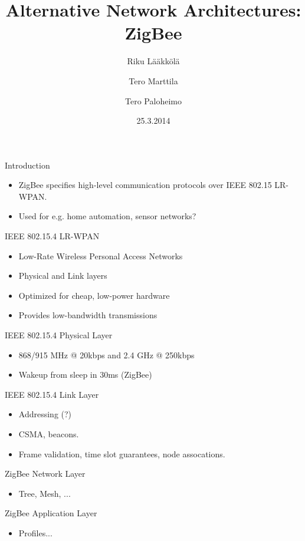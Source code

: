 \documentclass{beamer}
\title[ZigBee]{Alternative Network Architectures: ZigBee}
\author{Riku Lääkkölä \and Tero Marttila \and Tero Paloheimo}
\institute{Aalto ELEC}
\date{25.3.2014}
\begin{document}
\begin{frame}
  	\titlepage
\end{frame}


\begin{frame}{Introduction}
  \begin{itemize}
    \item ZigBee specifies high-level communication protocols over IEEE 802.15 LR-WPAN.
    \item Used for e.g. home automation, sensor networks?
  \end{itemize}
\end{frame}

\begin{frame}{IEEE 802.15.4 LR-WPAN}
  \begin{itemize}
  	\item Low-Rate Wireless Personal Access Networks
	\item Physical and Link layers
  	\item Optimized for cheap, low-power hardware
  	\item Provides low-bandwidth transmissions
  	
  \end{itemize}
\end{frame}

\begin{frame}{IEEE 802.15.4 Physical Layer}
  \begin{itemize}
  	\item 868/915 MHz @ 20kbps and 2.4 GHz @ 250kbps
    \item Wakeup from sleep in 30ms (ZigBee)
  \end{itemize}
\end{frame}
    
\begin{frame}{IEEE 802.15.4 Link Layer}
  \begin{itemize}
  	\item Addressing (?)
  	\item CSMA, beacons.
  	\item Frame validation, time slot guarantees, node assocations.
  \end{itemize}
\end{frame}

\begin{frame}{ZigBee Network Layer}
  \begin{itemize}
  	\item Tree, Mesh, ...
  \end{itemize}
\end{frame}

\begin{frame}{ZigBee Application Layer}
  \begin{itemize}
  	\item Profiles...
  \end{itemize}
\end{frame}
\end{document}

